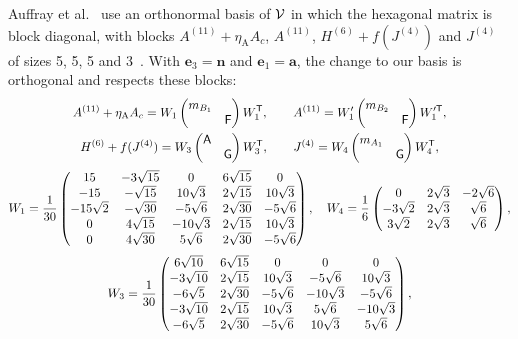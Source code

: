 Auffray et al.~\cite[eq.~(10) and table~2]{Auffray2013} use an orthonormal basis of
$\mathcal{V}$ in which the hexagonal matrix is block diagonal, with blocks
$A^{(11)}+\eta_{\mathrm A}A_c$, $A^{(11)}$, $H^{(6)}+f(J^{(4)})$ and $J^{(4)}$ of sizes 5, 5, 5 and
3~\cite[section~3.3.5]{Auffray2013}. With $\bm e_3=\bm n$ and $\bm e_1=\bm a$, the
change to our basis is orthogonal and respects these blocks:
\begin{equation}
\begin{gathered}
A^{(11)}+\eta_{\mathrm A}A_c=W_1\begin{pmatrix}m_{B_1}&\\&\mathsf{F}\end{pmatrix}W_1^{\mathsf T},\qquad
A^{(11)}=W_1'\begin{pmatrix}m_{B_2}&\\&\mathsf{F}\end{pmatrix}W_1'^{\mathsf T},\\
H^{(6)}+f(J^{(4)})=W_3\begin{pmatrix}\mathsf{A}&\\&\mathsf{G}\end{pmatrix}W_3^{\mathsf T},\qquad
J^{(4)}=W_4\begin{pmatrix}m_{A_1}&\\&\mathsf{G}\end{pmatrix}W_4^{\mathsf T},\\[2pt]
W_1=\frac1{30}\begin{pmatrix}
15&-3\sqrt{15}&0&6\sqrt{15}&0\\
-15&-\sqrt{15}&10\sqrt3&2\sqrt{15}&10\sqrt3\\
-15\sqrt2&-\sqrt{30}&-5\sqrt6&2\sqrt{30}&-5\sqrt6\\
0&4\sqrt{15}&-10\sqrt3&2\sqrt{15}&10\sqrt3\\
0&4\sqrt{30}&5\sqrt6&2\sqrt{30}&-5\sqrt6\end{pmatrix},\quad
W_4=\frac16\begin{pmatrix}0&2\sqrt3&-2\sqrt6\\-3\sqrt2&2\sqrt3&\sqrt6\\
3\sqrt2&2\sqrt3&\sqrt6\end{pmatrix},\\[2pt]
W_3=\frac1{30}\begin{pmatrix}
6\sqrt{10}&6\sqrt{15}&0&0&0\\
-3\sqrt{10}&2\sqrt{15}&10\sqrt3&-5\sqrt6&10\sqrt3\\
-6\sqrt5&2\sqrt{30}&-5\sqrt6&-10\sqrt3&-5\sqrt6\\
-3\sqrt{10}&2\sqrt{15}&10\sqrt3&5\sqrt6&-10\sqrt3\\
-6\sqrt5&2\sqrt{30}&-5\sqrt6&10\sqrt3&5\sqrt6\end{pmatrix},
\end{gathered}\label{eq:hex-auffray}
\end{equation}
